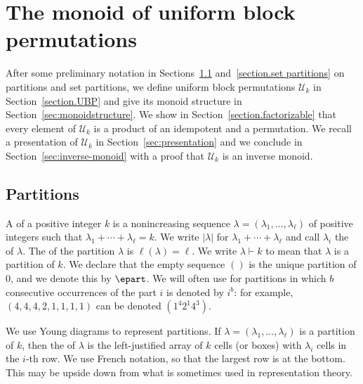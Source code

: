 



\section{The monoid of uniform block permutations}
\label{section.monoid}

After some preliminary notation in Sections~\ref{section.partitions} and~\ref{section.set partitions} on partitions and set partitions,
we define uniform block permutations $\mathcal{U}_k$ in Section~\ref{section.UBP} and give its monoid structure in Section~\ref{sec:monoidstructure}. 
We show in Section~\ref{section.factorizable} that every element of $\mathcal{U}_k$ is a product of an idempotent and a permutation. We recall a 
presentation of $\mathcal{U}_k$ in Section~\ref{sec:presentation} and we conclude in Section~\ref{sec:inverse-monoid} with a proof that $\mathcal{U}_k$ 
is an inverse monoid.

\subsection{Partitions}
\label{section.partitions}
A  of a positive integer $k$ is a nonincreasing sequence $\lambda = (\lambda_1, \ldots, \lambda_\ell)$ of positive integers such that 
$\lambda_1 + \cdots + \lambda_\ell = k$.
We write $|\lambda|$ for $\lambda_1 + \cdots + \lambda_\ell$ and call $\lambda_i$ the  of $\lambda$.
The  of the partition $\lambda$ is $\ell(\lambda)=\ell$.
We write $\lambda \vdash k$ to mean that $\lambda$ is a partition of $k$.
We declare that the empty sequence $()$ is the unique partition of $0$, and we denote this by $\epart$.
We will often use  for partitions in which $b$ consecutive occurrences of the part $i$ is denoted by $i^b$: 
for example, $(4,4,4,2,1,1,1,1)$ can be denoted $(1^4 2^1 4^3)$.

We use Young diagrams to represent partitions.  If $\lambda = (\lambda_1, \ldots, \lambda_\ell)$ is a partition of $k$, then the 
of $\lambda$ is the left-justified array of $k$ cells (or boxes) with $\lambda_i$ cells in the $i$-th row. We use French notation, so that
the largest row is at the bottom. This may be upside down from what is sometimes used in representation theory.


